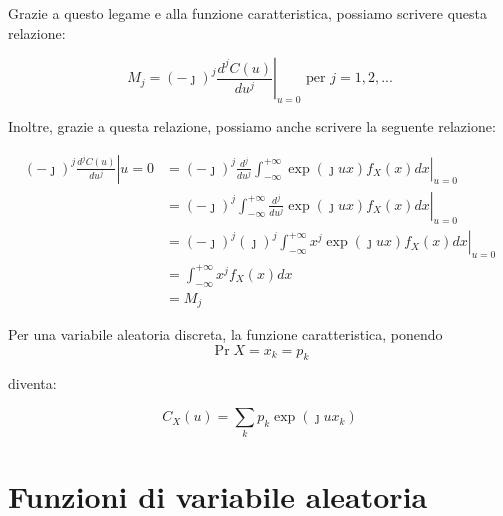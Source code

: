 Grazie a questo legame e alla funzione caratteristica, possiamo scrivere questa relazione: 

{
    \Large 
    \begin{equation}
        M_j = (-\jmath)^{j} \left. \frac{d^{j} C(u)}{du^{j}} \right|_{u = 0} 
        \text{ per } j = 1, 2, ...
    \end{equation}
}

Inoltre, grazie a questa relazione, possiamo anche scrivere la seguente relazione: 

{
    \Large 
    \begin{equation}
        \begin{split}
            (-\jmath)^{j} \left. \frac{d^{j} C(u)}{du^{j}} \right|{u = 0} 
            &= 
            (-\jmath) ^{j} \frac{d^{j}}{du^{j}}
            \left. 
            \int_{-\infty}^{+ \infty}
            \exp(\jmath u x)
            f_X (x) dx
            \right|_{u = 0}
            \\ 
            &=  
            (-\jmath) ^{j} 
            \left. 
            \int_{-\infty}^{+ \infty}
            \frac{d^{j}}{du^{j}}
            \exp(\jmath u x)
            f_X (x) dx
            \right|_{u = 0} 
            \\
            &= 
            (-\jmath) ^{j} 
            (\jmath) ^{j}
            \left. 
            \int_{-\infty}^{+ \infty}
            x^{j}
            \exp(\jmath u x)
            f_X (x) dx
            \right|_{u = 0}
            \\ 
            &=
            \int_{- \infty}^{+ \infty}
            x^{j} 
            f_X (x) dx 
            \\ 
            &= 
            M_j 
        \end{split}
    \end{equation}
}


Per una variabile aleatoria discreta, la funzione caratteristica, ponendo
{
    \Large 
    \begin{equation}
     \Pr{X = x_k} = p_k   
    \end{equation}
}  

diventa: 

{
    \Large 
    \begin{equation}
        C_X (u) = \sum_{k} p_k \exp(\jmath u x_k)
    \end{equation}
}

\newpage 

\section{Funzioni di variabile aleatoria}

